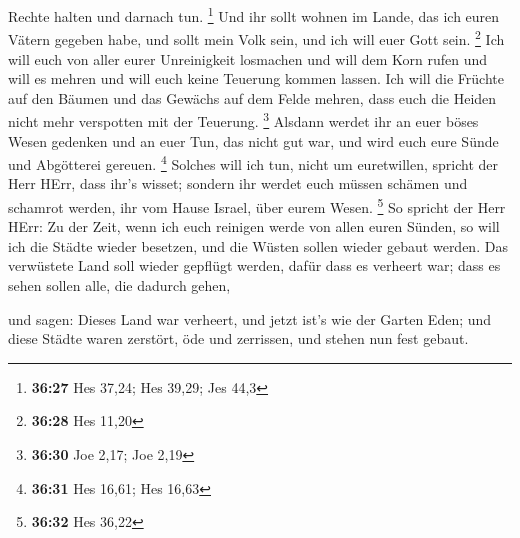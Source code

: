 Rechte halten und darnach tun. \footnote{\textbf{36:27} Hes 37,24; Hes
  39,29; Jes 44,3}  Und ihr sollt wohnen im Lande, das ich
euren Vätern gegeben habe, und sollt mein Volk sein, und ich will euer
Gott sein. \footnote{\textbf{36:28} Hes 11,20}  Ich will
euch von aller eurer Unreinigkeit losmachen und will dem Korn rufen und
will es mehren und will euch keine Teuerung kommen lassen. 
Ich will die Früchte auf den Bäumen und das Gewächs auf dem Felde
mehren, dass euch die Heiden nicht mehr verspotten mit der Teuerung.
\footnote{\textbf{36:30} Joe 2,17; Joe 2,19}  Alsdann
werdet ihr an euer böses Wesen gedenken und an euer Tun, das nicht gut
war, und wird euch eure Sünde und Abgötterei gereuen. \footnote{\textbf{36:31}
  Hes 16,61; Hes 16,63}  Solches will ich tun, nicht um
euretwillen, spricht der Herr HErr, dass ihr's wisset; sondern ihr
werdet euch müssen schämen und schamrot werden, ihr vom Hause Israel,
über eurem Wesen. \footnote{\textbf{36:32} Hes 36,22}  So
spricht der Herr HErr: Zu der Zeit, wenn ich euch reinigen werde von
allen euren Sünden, so will ich die Städte wieder besetzen, und die
Wüsten sollen wieder gebaut werden.  Das verwüstete Land
soll wieder gepflügt werden, dafür dass es verheert war; dass es sehen
sollen alle, die dadurch gehen,

 und sagen: Dieses Land war verheert, und jetzt ist's wie
der Garten Eden; und diese Städte waren zerstört, öde und zerrissen, und
stehen nun fest gebaut.

